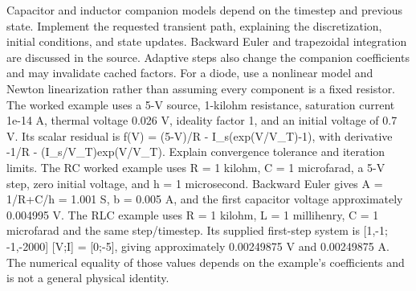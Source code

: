 \documentclass[11pt,a4paper]{article}
\begin{document}
Capacitor and inductor companion models depend on the timestep and previous state. Implement the requested transient path, explaining the discretization, initial conditions, and state updates. Backward Euler and trapezoidal integration are discussed in the source. Adaptive steps also change the companion coefficients and may invalidate cached factors. For a diode, use a nonlinear model and Newton linearization rather than assuming every component is a fixed resistor. The worked example uses a 5-V source, 1-kilohm resistance, saturation current 1e-14 A, thermal voltage 0.026 V, ideality factor 1, and an initial voltage of 0.7 V. Its scalar residual is f(V) =\allowbreak{} (5-V)/\allowbreak{}R - I\_\allowbreak{}s(exp(V/\allowbreak{}V\_\allowbreak{}T)-1), with derivative -1/\allowbreak{}R - (I\_\allowbreak{}s/\allowbreak{}V\_\allowbreak{}T)exp(V/\allowbreak{}V\_\allowbreak{}T). Explain convergence tolerance and iteration limits. The RC worked example uses R =\allowbreak{} 1 kilohm, C =\allowbreak{} 1 microfarad, a 5-V step, zero initial voltage, and h =\allowbreak{} 1 microsecond. Backward Euler gives A =\allowbreak{} 1/\allowbreak{}R+\allowbreak{}C/\allowbreak{}h =\allowbreak{} 1.001 S, b =\allowbreak{} 0.005 A, and the first capacitor voltage approximately 0.004995 V. The RLC example uses R =\allowbreak{} 1 kilohm, L =\allowbreak{} 1 millihenry, C =\allowbreak{} 1 microfarad and the same step/\allowbreak{}timestep. Its supplied first-step system is [1,-1;\allowbreak{} -1,-2000] [V;\allowbreak{}I] =\allowbreak{} [0;\allowbreak{}-5], giving approximately 0.00249875 V and 0.00249875 A. The numerical equality of those values depends on the example's coefficients and is not a general physical identity.
\end{document}
